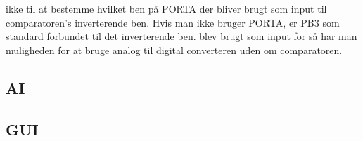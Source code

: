 ikke til at bestemme hvilket ben på PORTA der bliver brugt som input til comparatoren's inverterende ben.  Hvis man ikke bruger PORTA, er PB3 som standard forbundet til det inverterende ben. blev brugt som input for så har man muligheden for at bruge analog til digital converteren uden om comparatoren.

\subsection{AI}

\subsection{GUI}
